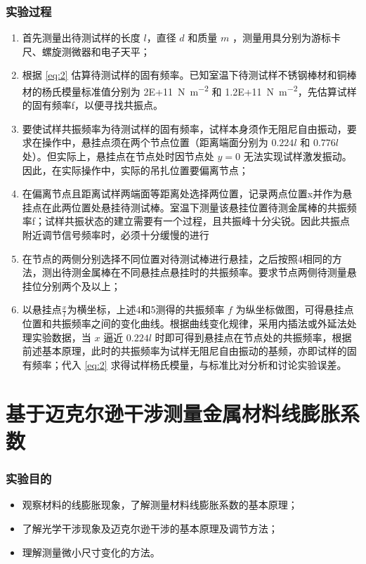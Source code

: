 \documentclass[a4paper,utf8]{article}
\begin{document}
\section{实验过程}%
    \begin{enumerate}
        \item 首先测量出待测试样的长度 $l$，直径 $d$ 和质量 $m$ ，测量用具分别为游标卡尺、螺旋测微器和电子天平；
        \item 根据 \eqref{eq:2} 估算待测试样的固有频率。已知室温下待测试样不锈钢棒材和铜棒材的杨氏模量标准值分别为 \SI{2E+11}{\N\per\m^2} 和 \SI{1.2E+11}{\N\per\m^2}，先估算试样的固有频率f，以便寻找共振点。
        \item 要使试样共振频率为待测试样的固有频率，试样本身须作无阻尼自由振动，要求在操作中，悬挂点须在两个节点位置（距离端面分别为 $0.224l$ 和 $0.776l$ 处）。但实际上，悬挂点在节点处时因节点处 $y=0$ 无法实现试样激发振动。因此，在实际操作中，实际的吊扎位置要偏离节点；
        \item 在偏离节点且距离试样两端面等距离处选择两位置，记录两点位置x并作为悬挂点在此两位置处悬挂待测试棒。室温下测量该悬挂位置待测金属棒的共振频率f；试样共振状态的建立需要有一个过程，且共振峰十分尖锐。因此共振点附近调节信号频率时，必须十分缓慢的进行
        \item 在节点的两侧分别选择不同位置对待测试棒进行悬挂，之后按照4相同的方法，测出待测金属棒在不同悬挂点悬挂时的共振频率。要求节点两侧待测量悬挂位分别两个及以上；
        \item 以悬挂点$\frac{x}{l}$为横坐标，上述4和5测得的共振频率 $f$ 为纵坐标做图，可得悬挂点位置和共振频率之间的变化曲线。根据曲线变化规律，采用内插法或外延法处理实验数据，当 $x$ 逼近 $0.224l$ 时即可得到悬挂点在节点处的共振频率，根据前述基本原理，此时的共振频率为试样无阻尼自由振动的基频，亦即试样的固有频率；代入 \eqref{eq:2} 求得试样杨氏模量，与标准比对分析和讨论实验误差。 
    \end{enumerate}
    \part{基于迈克尔逊干涉测量金属材料线膨胀系数}
    \setcounter{section}{0}
    \section{实验目的}
        \begin{itemize}
            \item 观察材料的线膨胀现象，了解测量材料线膨胀系数的基本原理；
            \item 了解光学干涉现象及迈克尔逊干涉的基本原理及调节方法； 
            \item 理解测量微小尺寸变化的方法。
        \end{itemize}
\end{document}
